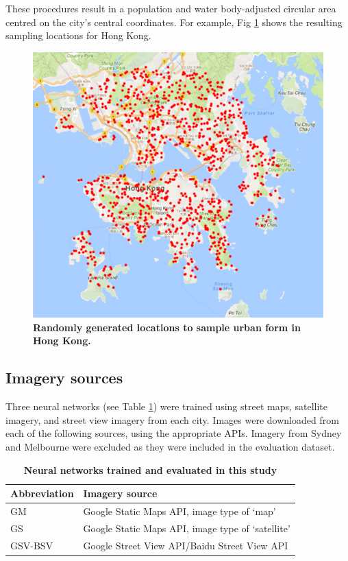 \documentclass[Crown,sageh,times]{sagej}
\begin{document}
These procedures result in a population and water body-adjusted circular area centred on the city's central coordinates. For example, Fig \ref{fig:hongkong} shows the resulting sampling locations for Hong Kong.



\begin{figure}[!htbp] 
\centering    
\includegraphics[scale=0.5]{Images/PlosOne/Fig1.png} 
\caption{\bf Randomly generated locations to sample urban form in Hong Kong.} 
\label{fig:hongkong}  
\end{figure}



\label{methodsimagery}
\subsection{Imagery sources}

Three neural networks (see Table \ref{tab:neuralnetworks}) were trained using street maps, satellite imagery, and street view imagery from each city. Images were downloaded from each of the following sources, using the appropriate APIs. Imagery from Sydney and Melbourne were excluded as they were included in the evaluation dataset. 


\begin{table}[!htbp]
\caption{\bf Neural networks trained and evaluated in this study \label{tab:neuralnetworks}}     
\begin{tabular}{ l l }
 \hline Abbreviation   &  Imagery source \\ \hline
GM & Google Static Maps API, image type of `map'     \\ 
GS & Google Static Maps API, image type of `satellite'      \\
GSV-BSV & Google Street View API/Baidu Street View API     \\ \hline

\end{tabular}
\end{table}
\end{document}
